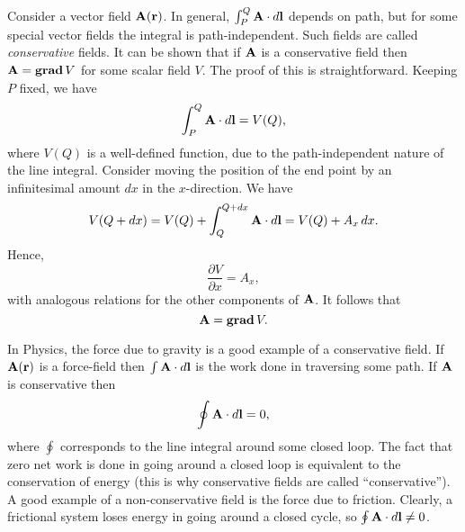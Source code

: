 Consider a vector field ${\bf A}({\bf r})$. In general, $\int_P^Q {\bf A}\cdot d{\bf l}$ depends on path,
but for some special vector fields the integral is path-independent. Such fields
are called {\em conservative} fields. It can be shown that if ${\bf A}$ is a
conservative field then ${\bf A} = {\bf grad}\,V$ for some scalar field $V$.
The proof of this is straightforward. Keeping $P$ fixed, we have
\begin{equation}
\int_P^Q {\bf A}\cdot d{\bf l} = V(Q),
\end{equation}
where $V(Q)$ is a well-defined function, due to the path-independent nature of the
line integral. Consider moving the position of the end point by an infinitesimal
amount $dx$ in the $x$-direction. We have
\begin{equation}
V(Q+dx) = V(Q) + \int_Q^{Q+dx} {\bf A}\cdot d{\bf l} = V(Q) + A_x\,dx.
\end{equation}
Hence,
\begin{equation}
\frac{\partial V}{\partial x} = A_x,
\end{equation}
with analogous relations for the other components of ${\bf A}$. It follows that
\begin{equation}
{\bf A} = {\bf grad} \,V.
\end{equation}

In Physics, the force due to gravity is a good example of a conservative field.
If ${\bf A}({\bf r})$ is a force-field then  $\int {\bf A}\cdot d{\bf l}$ is the work done
in traversing some path. If ${\bf A}$ is conservative then
\begin{equation}
\oint {\bf A}\cdot d{\bf l} = 0,
\end{equation}
where $\oint$ corresponds to the line integral around some closed loop. 
The fact that zero net work is done in going around a closed loop is equivalent
to the conservation of energy (this is why conservative fields are called
``conservative''). A good example of a non-conservative field is the force due
to friction. Clearly, a frictional system loses energy in going around a closed
cycle, so $\oint {\bf A}\cdot d{\bf l} \neq 0$. 


